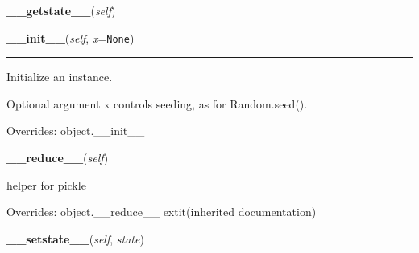     \label{random:Random:__getstate__}

    \vspace{0.5ex}

\hspace{.8\funcindent}\begin{boxedminipage}{\funcwidth}

    \raggedright \textbf{\_\_getstate\_\_}(\textit{self})

\setlength{\parskip}{2ex}
\setlength{\parskip}{1ex}
    \end{boxedminipage}

    \vspace{0.5ex}

\hspace{.8\funcindent}\begin{boxedminipage}{\funcwidth}

    \raggedright \textbf{\_\_init\_\_}(\textit{self}, \textit{x}={\tt None})

    \vspace{-1.5ex}

    \rule{\textwidth}{0.5\fboxrule}
\setlength{\parskip}{2ex}
    Initialize an instance.

    Optional argument x controls seeding, as for Random.seed().

\setlength{\parskip}{1ex}
      Overrides: object.\_\_init\_\_

    \end{boxedminipage}

    \vspace{0.5ex}

\hspace{.8\funcindent}\begin{boxedminipage}{\funcwidth}

    \raggedright \textbf{\_\_reduce\_\_}(\textit{self})

\setlength{\parskip}{2ex}
    helper for pickle

\setlength{\parskip}{1ex}
      Overrides: object.\_\_reduce\_\_ 	extit{(inherited documentation)}

    \end{boxedminipage}

    \label{random:Random:__setstate__}

    \vspace{0.5ex}

\hspace{.8\funcindent}\begin{boxedminipage}{\funcwidth}

    \raggedright \textbf{\_\_setstate\_\_}(\textit{self}, \textit{state})

\setlength{\parskip}{2ex}
\setlength{\parskip}{1ex}
    \end{boxedminipage}

